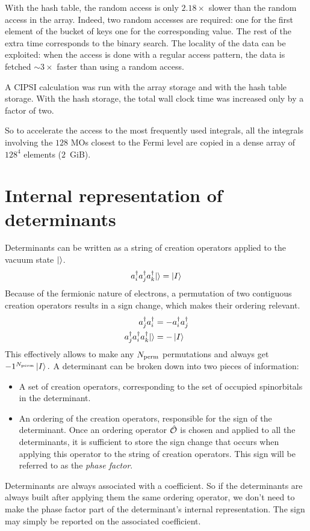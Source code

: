 \documentclass[./thesis.tex]{subfiles}
\begin{document}
With the hash table, the random access is only $2.18\times$ slower than the random access in the array. Indeed, two random accesses are required: one for the first element of the bucket of keys one for the corresponding value. The rest of the extra time corresponds to the binary search. The locality of the data can be exploited: when the access is done with a regular access pattern, the data is fetched $\sim 3\times$ faster than using a random access.

A CIPSI calculation was run with the array storage and with the hash table storage. With the hash storage, the total wall clock time was increased only by a factor of two.

So to accelerate the access to the most frequently used integrals, all the
integrals involving the $128$ MOs closest to the Fermi
level are copied in a dense array of $128^4$ elements ($2$~GiB).

\section{Internal representation of determinants}
\label{sec:det_representation}

Determinants can be written as a string of creation operators applied to the vacuum state ${\ket{}}$.
\begin{equation}
a^\dagger_{i} a^\dagger_{j} a^\dagger_{k} {\ket{}} = \ket{I}
\end{equation}
Because of the fermionic nature of electrons, a permutation of two contiguous creation operators results in a sign change, which makes their ordering relevant.
\begin{align}
a^\dagger_{j} a^\dagger_{i} & = -a^\dagger_{i} a^\dagger_{j} \\
a^\dagger_{j} a^\dagger_{i} a^\dagger_{k} {\ket{}} &=  -\ket{I}
\end{align}
This effectively allows to make any ${N_\text{perm}}$ permutations
and always get $-1^{{N_\text{perm}}} \ket{I}.$
A determinant can be broken down into two pieces of information:
\begin{itemize}
\item
A set of creation operators, corresponding to the set of occupied spinorbitals in the determinant.
\item
An ordering of the creation operators, responsible for the sign of the determinant. Once an ordering operator ${\hat{\mathcal{O}}}$ is chosen and applied to all the determinants, it is sufficient to store the sign change that occurs when applying this operator to the string of creation operators. This sign will be referred to as the \emph{phase factor}.
\end{itemize}
Determinants are always associated with a coefficient. So
if the determinants are always built after applying them the same ordering operator,
we don't need to make the phase factor part of the determinant's internal representation. The sign may simply be reported on the associated coefficient.
\end{document}
